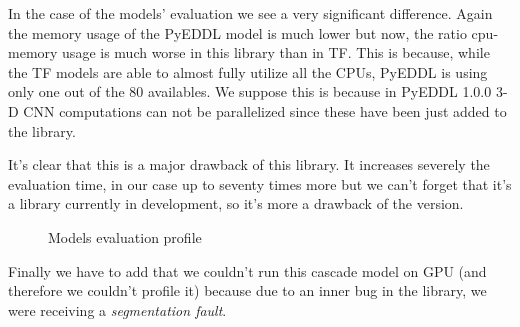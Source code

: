 In the case of the models' evaluation we see a very significant  difference. Again the memory usage of the PyEDDL model is much lower but now, the ratio cpu-memory usage is much worse in this library than in TF. This is because, while the TF models are able to almost fully utilize all the CPUs, PyEDDL is using only one out of the 80 availables. We suppose this is because in PyEDDL 1.0.0 3-D CNN computations can not be parallelized since these have been just added to the library.

It's clear that this is a major drawback of this library. It increases severely the evaluation time, in our case up to seventy times more but we can't forget that it's a library currently in development, so it's more a drawback of the version.  

\begin{figure}[!htb]   
    \hfill

    \hfill
    \caption{Models evaluation profile}
\end{figure}

Finally we have to add that we couldn't run this cascade model on GPU (and therefore we couldn't profile it) because due to an inner bug in the library, we were receiving a \textit{segmentation fault}.